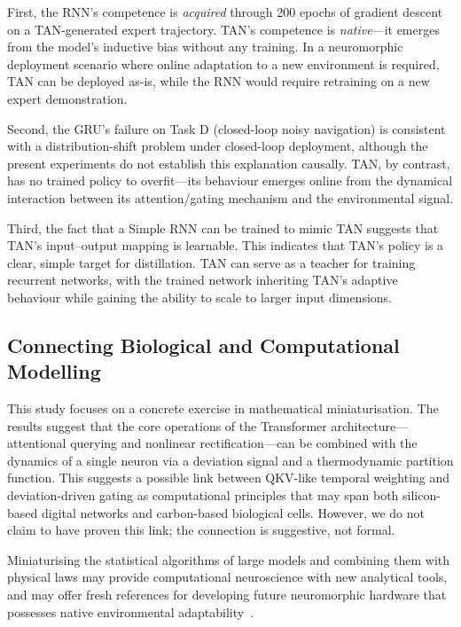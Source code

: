 First, the RNN's competence is \textit{acquired} through 200 epochs of gradient descent on a TAN-generated expert trajectory. TAN's competence is \textit{native}---it emerges from the model's inductive bias without any training. In a neuromorphic deployment scenario where online adaptation to a new environment is required, TAN can be deployed as-is, while the RNN would require retraining on a new expert demonstration.

Second, the GRU's failure on Task D (closed-loop noisy navigation) is consistent with a distribution-shift problem under closed-loop deployment, although the present experiments do not establish this explanation causally. TAN, by contrast, has no trained policy to overfit---its behaviour emerges online from the dynamical interaction between its attention/gating mechanism and the environmental signal.

Third, the fact that a Simple RNN can be trained to mimic TAN suggests that TAN's input--output mapping is learnable. This indicates that TAN's policy is a clear, simple target for distillation. TAN can serve as a teacher for training recurrent networks, with the trained network inheriting TAN's adaptive behaviour while gaining the ability to scale to larger input dimensions.

\subsection{Connecting Biological and Computational Modelling}

This study focuses on a concrete exercise in mathematical miniaturisation. The results suggest that the core operations of the Transformer architecture---attentional querying and nonlinear rectification---can be combined with the dynamics of a single neuron via a deviation signal and a thermodynamic partition function. This suggests a possible link between QKV-like temporal weighting and deviation-driven gating as computational principles that may span both silicon-based digital networks and carbon-based biological cells. However, we do not claim to have proven this link; the connection is suggestive, not formal.

Miniaturising the statistical algorithms of large models and combining them with physical laws may provide computational neuroscience with new analytical tools, and may offer fresh references for developing future neuromorphic hardware that possesses native environmental adaptability~\cite{roy2019,frenkel2023}.

